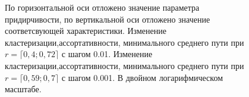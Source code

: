 \documentclass[10pt,aps,pra]{revtex4-1}
\begin{document}
\begin{figure}[H]  

\centering
{}  

\caption{
\label{fig:flowerParam}
По горизонтальной оси отложено значение параметра придирчивости, по вертикальной оси отложено значение соответсвующей характеристики.
 Изменение кластеризации,ассортативности, минимального среднего пути при $r=\lceil 0,4; 0,72 \rceil$ с шагом 0.01. 
 Изменение кластеризации,ассортативности, минимального среднего пути при $r=\lceil 0,59; 0,7 \rceil$ с шагом 0.001. В двойном логарифмическом масштабе.
}
\end{figure}


\end{document}
